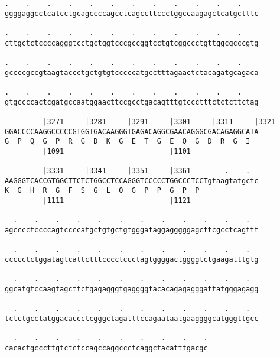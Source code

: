 \documentclass{article}
\begin{document}
\begin{Verbatim}
.    .    .    .    .    .    .    .    .    .    .    .    
ggggaggcctcatcctgcagccccagcctcagccttccctggccaagagctcatgctttc
                                                            
.    .    .    .    .    .    .    .    .    .    .    .    
cttgctctccccagggtcctgctggtcccgccggtcctgtcggccctgttggcgcccgtg
                                                            
.    .    .    .    .    .    .    .    .    .    .    .    
gccccgccgtaagtaccctgctgtgtcccccatgcctttagaactctacagatgcagaca
                                                            
.    .    .    .    .    .    .    .    .    .    .    .    
gtgccccactcgatgccaatggaacttccgcctgacagtttgtccctttctctcttctag
                                                            
         |3271     |3281     |3291     |3301     |3311     |3321
GGACCCCAAGGCCCCCGTGGTGACAAGGGTGAGACAGGCGAACAGGGCGACAGAGGCATA
G  P  Q  G  P  R  G  D  K  G  E  T  G  E  Q  G  D  R  G  I  
         |1091                         |1101                
  
         |3331     |3341     |3351     |3361        .    .  
AAGGGTCACCGTGGCTTCTCTGGCCTCCAGGGTCCCCCTGGCCCTCCTgtaagtatgctc
K  G  H  R  G  F  S  G  L  Q  G  P  P  G  P  P              
         |1111                         |1121                
  
  .    .    .    .    .    .    .    .    .    .    .    .  
agcccctccccagtccccatgctgtgctgtgggataggagggggagcttcgcctcagttt
                                                            
  .    .    .    .    .    .    .    .    .    .    .    .  
ccccctctggatagtcattctttcccctccctagtggggactggggtctgaagatttgtg
                                                            
  .    .    .    .    .    .    .    .    .    .    .    .  
ggcatgtccaagtagcttctgagagggtgaggggtacacagagagggattatgggagagg
                                                            
  .    .    .    .    .    .    .    .    .    .    .    .  
tctctgcctatggacaccctcgggctagatttccagaataatgaaggggcatgggttgcc
                                                            
  .    .    .    .    .    .    .    .    .    .
cacactgcccttgtctctccagccaggccctcaggctacatttgacgc
                                                
                                                
 

\end{Verbatim}
\end{document}
